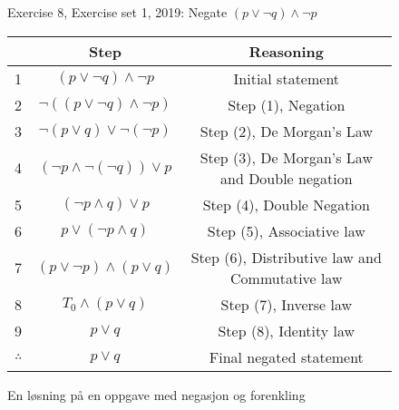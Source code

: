 \begin{figure}[h]
    \centering
    Exercise 8, Exercise set 1, 2019: Negate $(p \lor \neg q) \land \neg p$
        
    \begin{tabular}{ l | c c }
    \multicolumn{1}{l}{}
 &  \multicolumn{1}{c}{Step}
 & \multicolumn{1}{c}{Reasoning} \\
      \hline
    1 & $(p \lor \neg q) \land \neg p$ & Initial statement \\ 
    2 & $\neg ((p \lor \neg q) \land \neg p)$ & Step (1), Negation \\  
    3 & $\neg (p \lor q) \lor \neg ( \neg p)$ & Step (2), De Morgan's Law \\
    4 & $(\neg p \land \neg ( \neg q)) \lor p$ & Step (3), De Morgan's Law and Double negation\\
    5 & $(\neg p \land q) \lor p$ & Step (4), Double Negation\\
    6 & $p \lor (\neg p \land q)$ & Step (5), Associative law\\
    7 & $(p \lor \neg p) \land (p \lor q)$ & Step (6), Distributive law and Commutative law\\
    8 & $T_{0} \land (p \lor q)$ & Step (7), Inverse law\\
    9 & $p \lor q$ & Step (8), Identity law\\
    \hline
    $\therefore$ & $p \lor q$ & Final negated statement
    \end{tabular}
    \caption{En løsning på en oppgave med negasjon og forenkling}
    \label{}
\end{figure}
